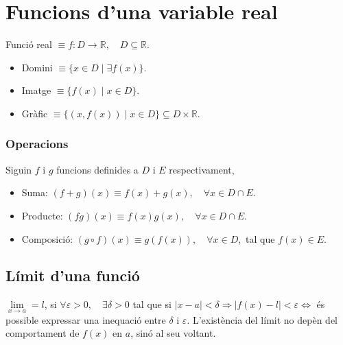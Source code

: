 \section{Funcions d'una variable real}
Funció real $\equiv f:D \to \mathbb{R}, \quad D \subseteq \mathbb{R}$.
\begin{itemize}
    \item Domini $\equiv \{ x \in D \mid \exists f(x) \}$.
    \item Imatge $\equiv \{ f(x) \mid x \in D \}$.
    \item Gràfic $\equiv \{ (x, f(x)) \mid x \in D \} \subseteq D \times \mathbb{R}$.
\end{itemize}

\subsubsection*{Operacions}
Siguin $f$ i $g$ funcions definides a $D$ i $E$ respectivament,
\begin{itemize}
    \item Suma: $(f+g)(x) \equiv f(x) + g(x), \quad \forall x \in D \cap E$.
    \item Producte: $(fg)(x) \equiv f(x) g(x), \quad \forall x \in D \cap E$.
    \item Composició: $(g \circ f)(x) \equiv g(f(x)), \quad \forall x \in D,$ tal que $f(x) \in E$.
\end{itemize}

\subsection{Límit d'una funció}
$\lim\limits_{x \to a} = l$, si $\forall \varepsilon > 0, \quad \exists \delta > 0$ tal que si $|x-a| < \delta \Rightarrow |f(x) - l | < \varepsilon \Leftrightarrow$ és possible expressar una inequació entre $\delta$ i $\varepsilon$. 
L'existència del límit no depèn del comportament de $f(x)$ en $a$, sinó al seu voltant.

